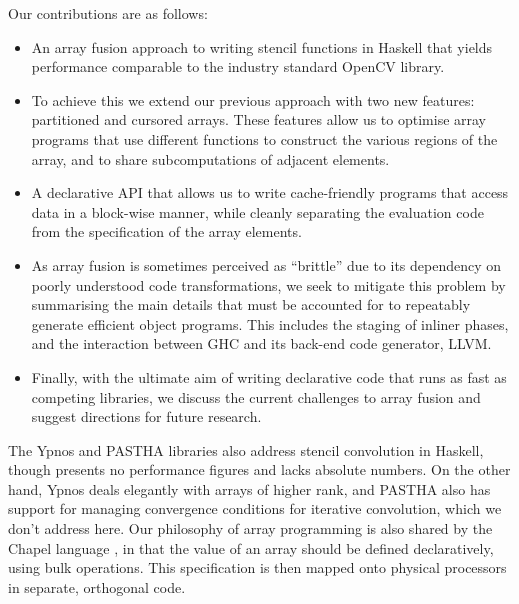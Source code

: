 Our contributions are as follows:
\begin{itemize}
\item	An array fusion approach to writing stencil functions in Haskell that yields performance comparable to the industry standard OpenCV library. 

\item	To achieve this we extend our previous approach \cite{Keller:repa} with two new features: partitioned and cursored arrays. These features allow us to optimise array programs that use different functions to construct the various regions of the array, and to share subcomputations of adjacent elements.

\item	A declarative API that allows us to write cache-friendly programs that access data in a block-wise manner, while cleanly separating the evaluation code from the specification of the array elements.

\item	As array fusion is sometimes perceived as ``brittle'' due to its dependency on poorly understood code transformations, we seek to mitigate this problem by summarising the main details that must be accounted for to repeatably generate efficient object programs. This includes the staging of inliner phases, and the interaction between GHC and its back-end code generator, LLVM.

\item	Finally, with the ultimate aim of writing declarative code that runs as fast as competing libraries, we discuss the current challenges to array fusion and suggest directions for future research.
\end{itemize}

The Ypnos \cite{Orchard:ypnos} and PASTHA \cite{Lesniak:pastha} libraries also address stencil convolution in Haskell, though \cite{Orchard:ypnos} presents no performance figures and \cite{Lesniak:pastha} lacks absolute numbers. On the other hand, Ypnos deals elegantly with arrays of higher rank, and PASTHA also has support for managing convergence conditions for iterative convolution, which we don't address here. Our philosophy of array programming is also shared by the Chapel language \cite{Barrett:finite-difference-chapel}, in that the value of an array should be defined declaratively, using bulk operations. This specification is then mapped onto physical processors in separate, orthogonal code.

